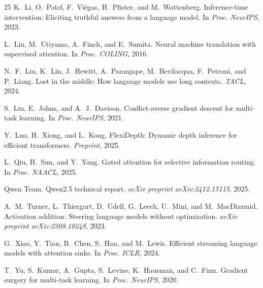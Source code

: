 \documentclass[11pt,a4paper]{article}
\begin{document}
\begin{thebibliography}{25}
K.~Li, O.~Patel, F.~Vi{\'e}gas, H.~Pfister, and M.~Wattenberg. Inference-time intervention: Eliciting truthful answers from a language model. In \emph{Proc. NeurIPS}, 2023.

L.~Liu, M.~Utiyama, A.~Finch, and E.~Sumita. Neural machine translation with supervised attention. In \emph{Proc. COLING}, 2016.

N.~F.~Liu, K.~Lin, J.~Hewitt, A.~Paranjape, M.~Bevilacqua, F.~Petroni, and P.~Liang. Lost in the middle: How language models use long contexts. \emph{TACL}, 2024.

S.~Liu, E.~Johns, and A.~J.~Davison. Conflict-averse gradient descent for multi-task learning. In \emph{Proc. NeurIPS}, 2021.

Y.~Luo, H.~Xiong, and L.~Kong. {FlexiDepth}: Dynamic depth inference for efficient transformers. \emph{Preprint}, 2025.

L.~Qiu, H.~Sun, and Y.~Yang. Gated attention for selective information routing. In \emph{Proc. NAACL}, 2025.

{Qwen Team}. Qwen2.5 technical report. \emph{arXiv preprint arXiv:2412.15115}, 2025.

A.~M.~Turner, L.~Thiergart, D.~Udell, G.~Leech, U.~Mini, and M.~MacDiarmid. Activation addition: Steering language models without optimization. \emph{arXiv preprint arXiv:2308.10248}, 2023.

G.~Xiao, Y.~Tian, B.~Chen, S.~Han, and M.~Lewis. Efficient streaming language models with attention sinks. In \emph{Proc. ICLR}, 2024.

T.~Yu, S.~Kumar, A.~Gupta, S.~Levine, K.~Hausman, and C.~Finn. Gradient surgery for multi-task learning. In \emph{Proc. NeurIPS}, 2020.

\end{thebibliography}
\end{document}
